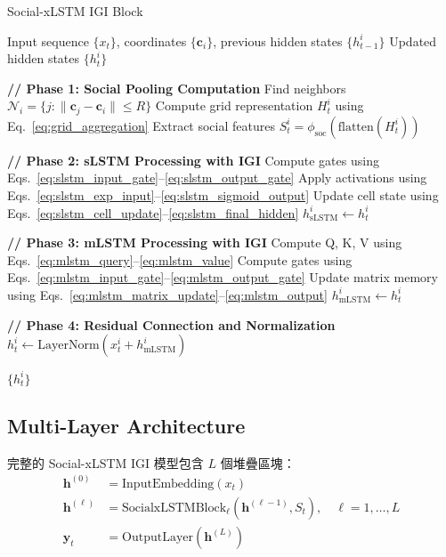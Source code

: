 \documentclass[11pt,a4paper]{article}
\begin{document}
\begin{algorithm}
\caption{Social-xLSTM IGI Block}
\label{alg:social_xlstm_block}
\begin{algorithmic}[1]
\REQUIRE Input sequence $\{x_t\}$, coordinates $\{\mathbf{c}_i\}$, previous hidden states $\{h_{t-1}^i\}$
\ENSURE Updated hidden states $\{h_t^i\}$

\STATE \textbf{// Phase 1: Social Pooling Computation}
    \STATE Find neighbors $\mathcal{N}_i = \{j : \|\mathbf{c}_j - \mathbf{c}_i\| \leq R\}$
    \STATE Compute grid representation $H_t^i$ using Eq.~\ref{eq:grid_aggregation}
    \STATE Extract social features $S_t^i = \phi_{\text{soc}}(\text{flatten}(H_t^i))$
\ENDFOR

\STATE \textbf{// Phase 2: sLSTM Processing with IGI}
    \STATE Compute gates using Eqs.~\ref{eq:slstm_input_gate}--\ref{eq:slstm_output_gate}
    \STATE Apply activations using Eqs.~\ref{eq:slstm_exp_input}--\ref{eq:slstm_sigmoid_output}
    \STATE Update cell state using Eqs.~\ref{eq:slstm_cell_update}--\ref{eq:slstm_final_hidden}
    \STATE $h_{\text{sLSTM}}^i \leftarrow h_t^i$
\ENDFOR

\STATE \textbf{// Phase 3: mLSTM Processing with IGI}
    \STATE Compute Q, K, V using Eqs.~\ref{eq:mlstm_query}--\ref{eq:mlstm_value}
    \STATE Compute gates using Eqs.~\ref{eq:mlstm_input_gate}--\ref{eq:mlstm_output_gate}
    \STATE Update matrix memory using Eqs.~\ref{eq:mlstm_matrix_update}--\ref{eq:mlstm_output}
    \STATE $h_{\text{mLSTM}}^i \leftarrow h_t^i$
\ENDFOR

\STATE \textbf{// Phase 4: Residual Connection and Normalization}
    \STATE $h_t^i \leftarrow \text{LayerNorm}(x_t^i + h_{\text{mLSTM}}^i)$
\ENDFOR

\RETURN $\{h_t^i\}$
\end{algorithmic}
\end{algorithm}

\subsection{Multi-Layer Architecture}

完整的 Social-xLSTM IGI 模型包含 $L$ 個堆疊區塊：
\begin{align}
\mathbf{h}^{(0)} &= \text{InputEmbedding}(x_t) \\
\mathbf{h}^{(\ell)} &= \text{SocialxLSTMBlock}_{\ell}(\mathbf{h}^{(\ell-1)}, S_t), \quad \ell = 1, \ldots, L \\
\mathbf{y}_t &= \text{OutputLayer}(\mathbf{h}^{(L)})
\end{align}
\end{document}
